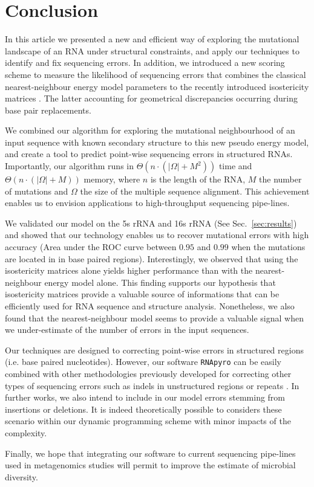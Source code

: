 \section{Conclusion}
\label{sec:conclusion}

In this article we presented a new and efficient way of exploring the mutational landscape of an RNA under structural constraints,
and apply our techniques to identify and fix sequencing errors. In addition, we introduced a new scoring scheme to measure the
likelihood of sequencing errors that combines the classical nearest-neighbour energy model parameters \cite{Turner2010} to the
recently introduced isostericity matrices \cite{Stombaugh2009}. The latter accounting for geometrical discrepancies occurring
during base pair replacements.

We combined our algorithm for exploring the mutational neighbourhood of an input sequence with known secondary structure to
this new pseudo energy model, and create a tool to predict point-wise sequencing errors in structured RNAs. Importantly, our
algorithm runs in  $\Theta(n\cdot(|\Omega|+M^2))$ time and $\Theta(n\cdot(|\Omega|+M))$ memory, where $n$ is the length of
the RNA, $M$ the number of mutations and $\Omega$ the size of the multiple sequence alignment. This achievement enables
us to envision applications to high-throughput sequencing pipe-lines.

We validated our model on the 5s rRNA and 16s rRNA (See Sec.~\ref{sec:results}) and showed that our technology enables us
to recover mutational errors with high accuracy (Area under the ROC curve between $0.95$ and $0.99$ when the mutations are
located in in base paired regions). Interestingly, we observed that using the isostericity matrices alone yields higher performance
than with the nearest-neighbour energy model alone. This finding supports our hypothesis that isostericity matrices provide a
valuable source of informations that can be efficiently used for RNA sequence and structure analysis. Nonetheless, we also found
that the nearest-neighbour model seems to provide a valuable signal when we under-estimate of the number of errors in the input
sequences.

Our techniques are designed to correcting point-wise errors in structured regions (i.e. base paired nucleotides). However,
our software \texttt{RNApyro} can be easily combined with other methodologies previously developed for correcting other types
of sequencing errors such as indels in unstructured regions or repeats \cite{Quinlan2008,Quince:2009uq}. In further works, we
also intend to include in our model errors stemming from insertions or deletions. It is indeed theoretically possible to considers
these scenario within our dynamic programming scheme \cite{Waldispuhl:2002fk} with minor impacts of the complexity.

Finally, we hope that integrating our software to current sequencing pipe-lines used in metagenomics studies will permit to
improve the estimate of microbial diversity.


